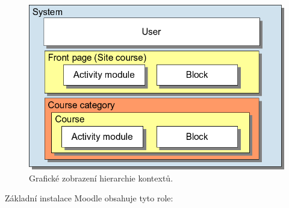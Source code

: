 \documentclass[
print,
  11pt,
  table,   
  nolof,    
  nolot,
  oneside,final
]{fithesis3}
\begin{document}
		\begin{figure}
		  \begin{center}
		    \includegraphics[width=120mm]{images/moodle-context.png}
		   \end{center}
		  \caption{Grafické zobrazení hierarchie kontextů.   \cite{moodle-context}}
		  \label{fig:moodlecontext}
		\end{figure}
Základní instalace Moodle obsahuje tyto role:
\end{document}
